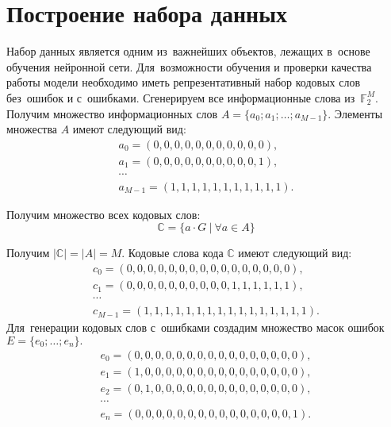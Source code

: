 \section{Построение набора данных}

Набор данных является одним из~важнейших объектов, лежащих в~основе обучения нейронной сети. Для~возможности обучения и проверки качества работы модели необходимо иметь репрезентативный\cite{bib:representative_data_sets} набор кодовых слов без~ошибок и с~ошибками.
Сгенерируем все информационные слова из~$\mathbb{F}_2^M$. Получим множество информационных слов $A = \{a_0; a_1; \dots; a_{M-1}\}$. Элементы множества $A$ имеют следующий вид:
\begin{gather}
  \nonumber a_0 = (0, 0, 0, 0, 0, 0, 0, 0, 0, 0, 0), \\
  \nonumber a_1 = (0, 0, 0, 0, 0, 0, 0, 0, 0, 0, 1), \\
  \nonumber \cdots \\
  \nonumber a_{M-1} = (1, 1, 1, 1, 1, 1, 1, 1, 1, 1, 1).
\end{gather}

Получим множество всех кодовых слов:
\begin{equation*}
  \mathbb{C} = \{a\cdot G~|~\forall a \in A \}
\end{equation*}

Получим $|\mathbb{C}| = |A| = M$. Кодовые слова кода $\mathbb{C}$ имеют следующий вид:
\begin{gather}
    \nonumber c_0 = (0, 0, 0, 0, 0, 0, 0, 0, 0, 0, 0, 0, 0, 0, 0, 0), \\
    \nonumber c_1 = (0, 0, 0, 0, 0, 0, 0, 0, 0, 0, 1, 1, 1, 1, 1, 1), \\
    \nonumber \cdots \\
    \nonumber c_{M-1} = (1, 1, 1, 1, 1, 1, 1, 1, 1, 1, 1, 1, 1, 1, 1, 1).
\end{gather}
\newpage
Для~генерации кодовых слов с~ошибками создадим множество масок ошибок $E = \{e_0; \dots; e_n\}.$
\begin{gather}
    \nonumber e_0 = (0, 0, 0, 0, 0, 0, 0, 0, 0, 0, 0, 0, 0, 0, 0, 0), \\
    \nonumber e_1 = (1, 0, 0, 0, 0, 0, 0, 0, 0, 0, 0, 0, 0, 0, 0, 0), \\
    \nonumber e_2 = (0, 1, 0, 0, 0, 0, 0, 0, 0, 0, 0, 0, 0, 0, 0, 0), \\
    \nonumber \cdots                                                \\
    \nonumber e_n = (0, 0, 0, 0, 0, 0, 0, 0, 0, 0, 0, 0, 0, 0, 0, 1).
\end{gather}

